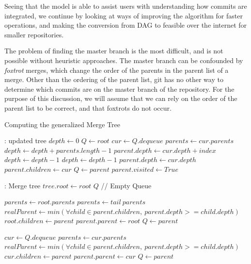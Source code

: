 \documentclass[draft]{IEEEtran}
\begin{document}
Seeing that the \mt model is able to assist users with understanding how
commits are integrated, we continue by looking at ways of improving the
algorithm for faster operations, and making the conversion from DAG to
\mt feasible over the internet for smaller repositories.

The problem of finding the master branch is the most difficult, and is
not possible without heuristic approaches. The master branch can be
confounded by \textit{foxtrot} merges, which change the order of the
parents in the parent list of a merge. Other than the ordering of the
parent list, git has no other way to determine which commits are on the
master branch of the repository. For the purpose of this discussion, we
will assume that we can rely on the order of the parent list to be
correct, and that foxtrots do not occur.

\begin{algorithm}
  \caption{Computing the generalized Merge Tree}
  \label{alg:generalized}
  \begin{algorithmic}[1]
     : updated tree
    \State $depth \gets 0$
    \State $Q \gets root$
    \Do
    \State $cur \gets Q.dequeue$
    \State $parents \gets cur.parents$
    \State $depth \gets depth + parents.length - 1$
    \State $parent.depth \gets cur.depth + index$
    \State $depth \gets depth - 1$
    \State $depth \gets depth - 1$
    \State $parent.depth \gets cur.depth$
    \EndIf
    \State $parent.children \gets cur$
    \State $Q \gets parent$
    \State $parent.visited \gets True$
    \EndIf
    \EndFor
    \EndFunction

     : Merge tree
    \State $tree.root \gets root$
    \State $Q$ // Empty Queue

    \State $parents \gets root.parents$
    \State $parents \gets tail\ parents$
    \State $realParent \gets min(\forall child \in parent.children,\ parent.depth >= child.depth)$
    \State $root.children \gets parent$
    \State $parent.parent \gets root$
    \State $Q \gets parent$
    \EndIf
    \EndFor

    \State $cur \gets Q.dequeue$
    \State $parents \gets cur.parents$
    \State $realParent \gets min(\forall child \in parent.children,\ parent.depth >= child.depth)$
    \State $cur.children \gets parent$
    \State $parent.parent \gets cur$
    \State $Q \gets parent$
    \EndIf

    \EndFor
    \EndWhile

    \EndFunction
  \end{algorithmic}
\end{algorithm}
\end{document}
